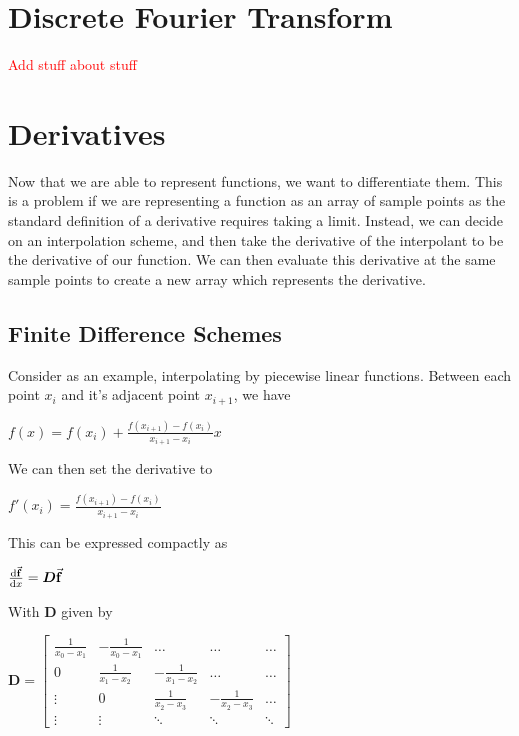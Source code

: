 \documentclass[12pt,letterpaper]{article}
\numberwithin{equation}{section}
\begin{document}
\section{Discrete Fourier Transform}
\textcolor{red}{Add stuff about stuff}

\section{Derivatives}
Now that we are able to represent functions, we want to differentiate them. This is a problem if we are representing a function as an array of sample points as the standard definition of a derivative requires taking a limit. Instead, we can decide on an interpolation scheme, and then take the derivative of the interpolant to be the derivative of our function. We can then evaluate this derivative at the same sample points to create a new array which represents the derivative.

\subsection{Finite Difference Schemes}
Consider as an example, interpolating by piecewise linear functions. Between each point $x_i$ and it's adjacent point $x_{i+1}$, we have

\begin{center}
$f(x) = f(x_i) + \frac{f(x_{i+1}) - f(x_i)}{x_{i+1} - x_i}x$
\end{center}

\noindent We can then set the derivative to

\begin{center}
$f'(x_i) = \frac{f(x_{i+1}) - f(x_i)}{x_{i+1} - x_i}$
\end{center}

\noindent This can be expressed compactly as

\begin{center}
$\dv{\va{f}}{x} = \boldsymbol{D} \va{f}$
\end{center}

\noindent With $\boldsymbol{D}$ given by

\begin{center}
$
\boldsymbol{D}
=
\begin{bmatrix}
	\frac{1}{x_0 - x_1} & -\frac{1}{x_0 - x_1} & \dots & \dots & \dots \\ 
	0 & \frac{1}{x_1 - x_2} & -\frac{1}{x_1 - x_2} & \dots & \dots \\
	\vdots & 0 & \frac{1}{x_2 - x_3} & -\frac{1}{x_2 - x_3} & \dots \\
	\vdots & \vdots & \ddots & \ddots & \ddots
\end{bmatrix}
$
\end{center}
\end{document}
